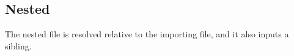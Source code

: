 \subsection{Nested}
The nested file is resolved relative to the importing file, and it also inputs a sibling.


